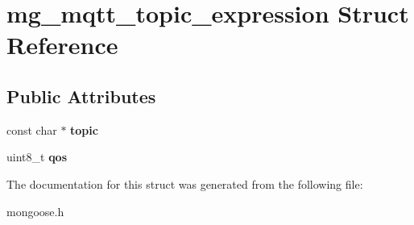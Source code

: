 \hypertarget{structmg__mqtt__topic__expression}{}\section{mg\+\_\+mqtt\+\_\+topic\+\_\+expression Struct Reference}
\label{structmg__mqtt__topic__expression}
\subsection*{Public Attributes}
\begin{DoxyCompactItemize}
\item 
\mbox{\label{structmg__mqtt__topic__expression_a04074697217a1c329b32a9242d63ed8f}} 
const char $\ast$ {\bfseries topic}
\item 
\mbox{\label{structmg__mqtt__topic__expression_a56df5bba82939797c94dd68993b0beff}} 
uint8\+\_\+t {\bfseries qos}
\end{DoxyCompactItemize}


The documentation for this struct was generated from the following file\+:\begin{DoxyCompactItemize}
\item 
mongoose.\+h\end{DoxyCompactItemize}
